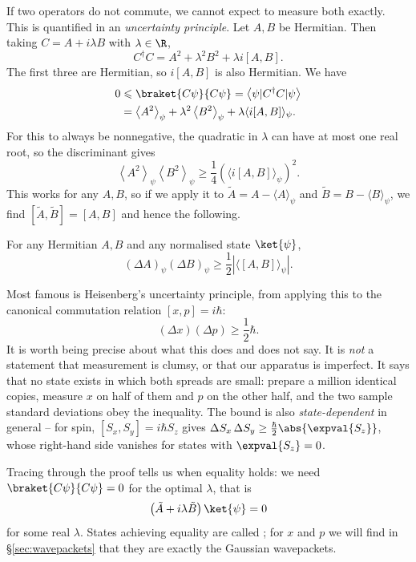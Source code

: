 If two operators do not commute, we cannot expect to measure both exactly. This is quantified in an \emph{uncertainty principle}. Let $A, B$ be Hermitian. Then taking $C = A + i\lambda B$ with $\lambda \in \R$,
$$
C^{\dagger} C=A^2+\lambda^2 B^2+\lambda i[A, B] .
$$
The first three are Hermitian, so $i[A, B]$ is also Hermitian. We have
$$
\begin{aligned}
0 & \leqslant \braket{C \psi}{C \psi}=\left\langle\psi\lvert C^{\dagger} C \rvert \psi\right\rangle \\
& =\left\langle A^2\right\rangle_\psi+\lambda^2\left\langle B^2\right\rangle_\psi+\lambda\langle i[A, B]\rangle_\psi .
\end{aligned}
$$
For this to always be nonnegative, the quadratic in $\lambda$ can have at most one real root, so the discriminant gives
$$
\left\langle A^2\right\rangle_\psi\left\langle B^2\right\rangle_\psi \geqslant \frac{1}{4}\left(\langle i[A, B]\rangle_\psi\right)^2 .
$$
This works for any $A, B$, so if we apply it to $\tilde{A}=A-\langle A\rangle_\psi$ and $\tilde{B}=B-\langle B\rangle_\psi$, we find $[\tilde{A}, \tilde{B}]=[A, B]$ and hence the following.

\begin{theorem}
    For any Hermitian $A, B$ and any normalised state $\ket{\psi}$,
    $$
    (\Delta A)_\psi(\Delta B)_\psi \geqslant \frac{1}{2}\left|\langle[A, B]\rangle_\psi\right| .
    $$
\end{theorem}

Most famous is Heisenberg's uncertainty principle, from applying this to the canonical commutation relation $[x, p] = i\hbar$:
$$
(\Delta x)(\Delta p) \geqslant \frac{1}{2} \hbar .
$$
It is worth being precise about what this does and does not say. It is \emph{not} a statement that measurement is clumsy, or that our apparatus is imperfect. It says that no state exists in which both spreads are small: prepare a million identical copies, measure $x$ on half of them and $p$ on the other half, and the two sample standard deviations obey the inequality. The bound is also \emph{state-dependent} in general -- for spin, $[S_x, S_y] = i\hbar S_z$ gives $\Delta S_x \, \Delta S_y \geq \frac{\hbar}{2}\abs{\expval{S_z}}$, whose right-hand side vanishes for states with $\expval{S_z} = 0$.

Tracing through the proof tells us when equality holds: we need $\braket{C\psi}{C\psi} = 0$ for the optimal $\lambda$, that is
$$
\left( \tilde A + i \lambda \tilde B \right)\ket{\psi} = 0
$$
for some real $\lambda$. States achieving equality are called ; for $x$ and $p$ we will find in \S\ref{sec:wavepackets} that they are exactly the Gaussian wavepackets.

